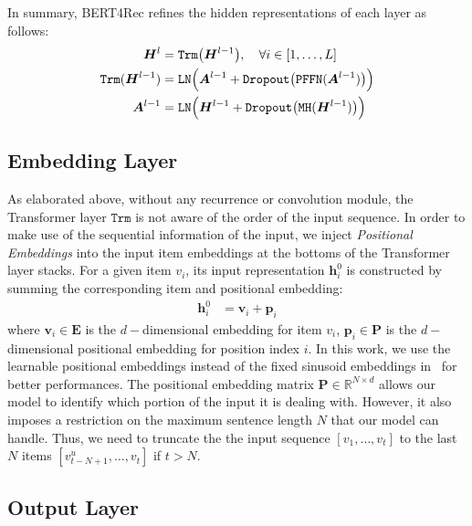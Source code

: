 In summary, BERT4Rec refines the hidden representations of each layer as follows:
\begin{align}
    \bm{H}^l &= \mathtt{Trm}\bigl(\bm{H}^{l-1}\bigr), \quad \forall i \in [1,\dots, L] \\
    \mathtt{Trm}(\bm{H}^{l-1}) &= \mathtt{LN}\Bigl(\bm{A}^{l-1} +  \mathtt{Dropout}\bigl(\mathtt{PFFN}(\bm{A}^{l-1})\bigr)\Bigr) \\
    \bm{A}^{l-1} &= \mathtt{LN}\Bigr(\bm{H}^{l-1} + \mathtt{Dropout}\bigl(\mathtt{MH}(\bm{H}^{l-1})\bigr)\Bigr) 
\end{align}


\subsection{Embedding Layer}
As elaborated above, without any recurrence or convolution module, the Transformer layer $\mathtt{Trm}$ is not aware of the order of the input sequence.
In order to make use of the sequential information of the input, we inject \textit{Positional Embeddings} into the input item embeddings at the bottoms of the Transformer layer stacks.
For a given item $v_i$, its input representation $\bm{h}_i^0$ is constructed by summing the corresponding item and positional embedding:
\begin{equation*}
    \begin{aligned}
        \bm{h}_{i}^0 &= \bm{v}_i + \bm{p}_i
    \end{aligned}
\end{equation*}
where $\bm{v}_i {\in} \bm{E}$ is the $d-$dimensional embedding for item $v_i$, $\bm{p}_i {\in} \bm{P}$ is the $d-$dimensional positional embedding for position index $i$.
In this work, we use the learnable positional embeddings instead of the fixed sinusoid embeddings in~\cite{Vaswani:nips2017:Attention} for better performances.
The positional embedding matrix $\bm{P} \in \mathbb{R}^{N\times d}$ allows our model to identify which portion of the input it is dealing with.
However, it also imposes a restriction on the maximum sentence length $N$ that our model can handle.
Thus, we need to truncate the the input sequence $[v_1,\dots,v_t]$ to the last $N$ items $[v_{t-N+1}^{u},\dots,v_t]$ if $t>N$.

\subsection{Output Layer}

